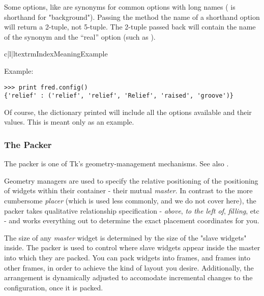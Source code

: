 Some options, like  are synonyms for common options with long
names ( is shorthand for "background"). Passing the
 method the name of a shorthand option will return a
2-tuple, not 5-tuple. The 2-tuple passed back will contain the name of
the synonym and the ``real'' option (such as ).

\begin{tableiii}{c|l|l}{textrm}{Index}{Meaning}{Example}
                         {}
     {}
    {}
                       {}
                       {}
\end{tableiii}


Example:

\begin{verbatim}
>>> print fred.config()
{'relief' : ('relief', 'relief', 'Relief', 'raised', 'groove')}
\end{verbatim}

Of course, the dictionary printed will include all the options
available and their values.  This is meant only as an example.


\subsubsection{The Packer} %

The packer is one of Tk's geometry-management mechanisms.  See also
.

Geometry managers are used to specify the relative positioning of the
positioning of widgets within their container - their mutual
\emph{master}.  In contrast to the more cumbersome \emph{placer}
(which is used less commonly, and we do not cover here), the packer
takes qualitative relationship specification - \emph{above}, \emph{to
the left of}, \emph{filling}, etc - and works everything out to
determine the exact placement coordinates for you. 

The size of any \emph{master} widget is determined by the size of
the "slave widgets" inside.  The packer is used to control where slave
widgets appear inside the master into which they are packed.  You can
pack widgets into frames, and frames into other frames, in order to
achieve the kind of layout you desire.  Additionally, the arrangement
is dynamically adjusted to accomodate incremental changes to the
configuration, once it is packed.

